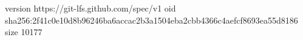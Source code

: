 version https://git-lfs.github.com/spec/v1
oid sha256:2f41c0e10d8b96246ba6accac2b3a1504eba2cbb4366c4aefcf8693ea55d8186
size 10177
